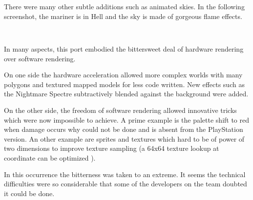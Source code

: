 \\

\\
\par


There were many other subtle additions such as animated skies. In the following screenshot, the mariner is in Hell and the sky is made of gorgeous flame effects.\\
\par
{}\\
\par
In many aspects, this port embodied the bittersweet deal of hardware rendering over software rendering.\\
\par
On one side the hardware acceleration allowed more complex worlds with many polygons and textured mapped models for less code written. New effects such as the Nightmare Spectre subtractively blended against the background were added.\\
\par
 On the other side, the freedom of software rendering allowed innovative tricks which were now impossible to achieve. A prime example is the palette shift to red when damage occurs why could not be done and is absent from the PlayStation version. An other example are sprites and textures which hard to be of power of two dimensions to improve texture sampling (a 64x64 texture lookup at coordinate  can be optimized ).\\
\par
In this occurrence the bitterness was taken to an extreme. It seems the technical difficulties were so considerable that some of the developers on the team doubted it could be done.


